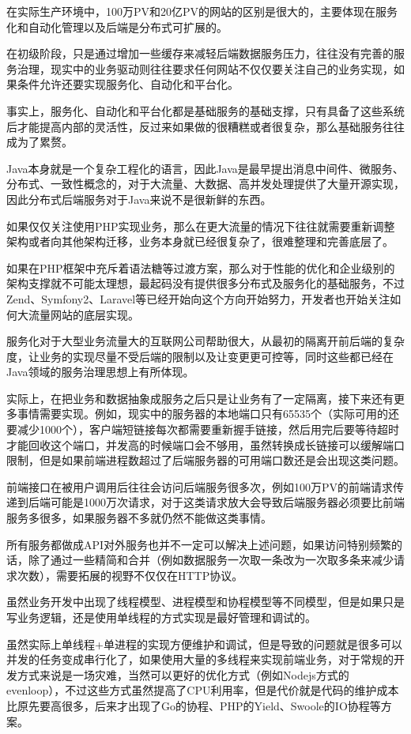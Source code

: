 在实际生产环境中，100万PV和20亿PV的网站的区别是很大的，主要体现在服务化和自动化管理以及后端是分布式可扩展的。

在初级阶段，只是通过增加一些缓存来减轻后端数据服务压力，往往没有完善的服务治理，现实中的业务驱动则往往要求任何网站不仅仅要关注自己的业务实现，如果条件允许还要实现服务化、自动化和平台化。

事实上，服务化、自动化和平台化都是基础服务的基础支撑，只有具备了这些系统后才能提高内部的灵活性，反过来如果做的很糟糕或者很复杂，那么基础服务往往成为了累赘。

Java本身就是一个复杂工程化的语言，因此Java是最早提出消息中间件、微服务、分布式、一致性概念的，对于大流量、大数据、高并发处理提供了大量开源实现，因此分布式后端服务对于Java来说不是很新鲜的东西。

如果仅仅关注使用PHP实现业务，那么在更大流量的情况下往往就需要重新调整架构或者向其他架构迁移，业务本身就已经很复杂了，很难整理和完善底层了。

如果在PHP框架中充斥着语法糖等过渡方案，那么对于性能的优化和企业级别的架构支撑就不可能太理想，最起码没有提供很多分布式及服务化的基础服务，不过Zend、Symfony2、Laravel等已经开始向这个方向开始努力，开发者也开始关注如何大流量网站的底层实现。



服务化对于大型业务流量大的互联网公司帮助很大，从最初的隔离开前后端的复杂度，让业务的实现尽量不受后端的限制以及让变更更可控等，同时这些都已经在Java领域的服务治理思想上有所体现。

实际上，在把业务和数据抽象成服务之后只是让业务有了一定隔离，接下来还有更多事情需要实现。例如，现实中的服务器的本地端口只有65535个（实际可用的还要减少1000个），客户端短链接每次都需要重新握手链接，然后用完后要等待超时才能回收这个端口，并发高的时候端口会不够用，虽然转换成长链接可以缓解端口限制，但是如果前端进程数超过了后端服务器的可用端口数还是会出现这类问题。

前端接口在被用户调用后往往会访问后端服务很多次，例如100万PV的前端请求传递到后端可能是1000万次请求，对于这类请求放大会导致后端服务器必须要比前端服务多很多，如果服务器不多就仍然不能做这类事情。

所有服务都做成API对外服务也并不一定可以解决上述问题，如果访问特别频繁的话，除了通过一些精简和合并（例如数据服务一次取一条改为一次取多条来减少请求次数），需要拓展的视野不仅仅在HTTP协议。

虽然业务开发中出现了线程模型、进程模型和协程模型等不同模型，但是如果只是写业务逻辑，还是使用单线程的方式实现是最好管理和调试的。

虽然实际上单线程+单进程的实现方便维护和调试，但是导致的问题就是很多可以并发的任务变成串行化了，如果使用大量的多线程来实现前端业务，对于常规的开发方式来说是一场灾难，当然可以更好的优化方式（例如Nodejs方式的evenloop），不过这些方式虽然提高了CPU利用率，但是代价就是代码的维护成本比原先要高很多，后来才出现了Go的协程、PHP的Yield、Swoole的IO协程等方案。



